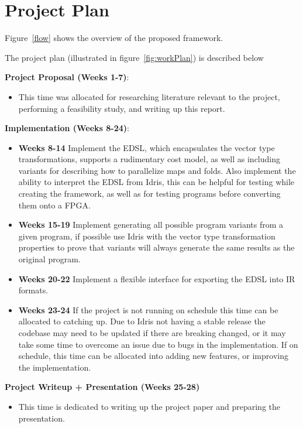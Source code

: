 \section{Project Plan}

Figure~\ref{flow} shows the overview of the proposed framework.

The project plan (illustrated in figure~\ref{fig:workPlan}) is described below

\textbf{Project Proposal (Weeks 1-7)}:
\begin{itemize}
\item This time was allocated for researching literature relevant to the project, performing a feasibility study, and writing up this report.
\end{itemize}

\textbf{Implementation (Weeks 8-24)}: 
\begin{itemize}
\item \textbf{Weeks 8-14} Implement the EDSL, which encapsulates the vector type transformations, supports
      a rudimentary cost model, as well as including variants for describing how to parallelize
      maps and folds. Also implement the ability to interpret the EDSL from Idris, this can
      be helpful for testing while creating the framework, as well as for
      testing programs before converting them onto a FPGA.

\item \textbf{Weeks 15-19} Implement generating all possible program variants from a given program,
      if possible use Idris with the vector type transformation properties to prove
      that variants will always generate the same results as the original program.

\item \textbf{Weeks 20-22} Implement a flexible interface for exporting the EDSL into IR formats.

\item \textbf{Weeks 23-24} If the project is not running on schedule this time can be allocated to catching up.
Due to Idris not having a stable release the codebase may need to be updated if there are breaking changed,
or it may take some time to overcome an issue due to bugs in the implementation. If on schedule, this time
can be allocated into adding new features, or improving the implementation.
\end{itemize}

\textbf{Project Writeup + Presentation (Weeks 25-28)}
\begin{itemize}
\item This time is dedicated to writing up the project paper and preparing 
the presentation.
\end{itemize}





